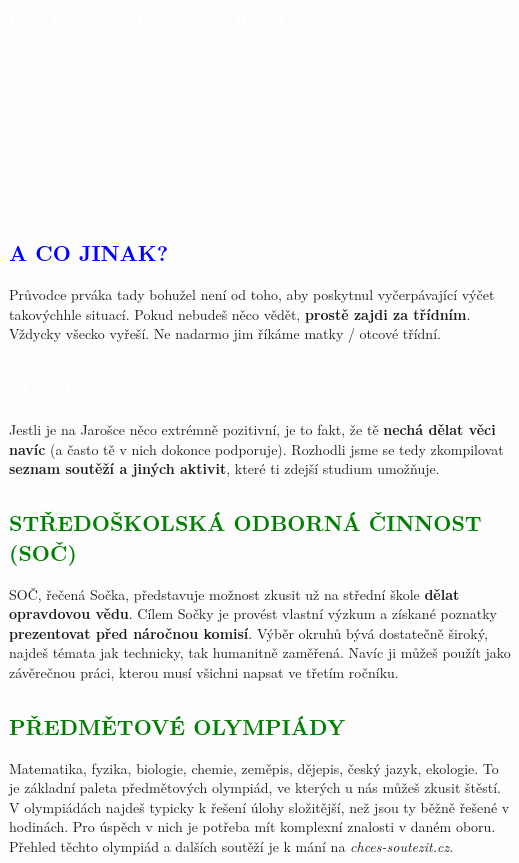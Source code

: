 \documentclass{article}
\newcommand{\nadpiss}[1]{
\vspace*{-60pt}
  \begin{nadpisboxs}
    \vspace*{20pt}
    \centering \section*{\textcolor{white}{#1}}
  \end{nadpisboxs}
}
\newcommand{\podnadpisf}[1]{
  \subsection*{\textcolor{blue}{#1}}
}
\newcommand{\podnadpiss}[1]{
  \subsection*{\textcolor{green}{#1}}
}
\begin{document}
\begin{bluebox}
  \textcolor{white}{\subsection*{OMLUVENÍ Z TĚLOCVIKU}
  To by jen tak nešlo. Nejdřív ti \textbf{doktor musí vydat nějaké lejstro} či potvrzení o tom, že do toho tělocviku prostě nemůžeš chodit, pak ho předáš nám a... jsi omluven. Bude tam ještě trocha papírování, ale snažíme se vycházet vstříc (nebudeme, proboha, nikoho nutit cvičit se sádrou). V prváku také podstupujeme \textbf{test plavecké zdatnosti}, kterému se nevyhneš bez uvolnění. Pokud na něj v prváku nepřijdeš, půjdeš ve druháku. Tak důslední jsme. (Pokud nepřijdeš v druháku, přijdeš ve třeťáku. Pokud nepřijdeš ve třeťáku a zvolíš si vodácký kurz, budeš zkoušky provádět na místě před všemi svými spolužáky.)
  }
\end{bluebox}

\podnadpisf{A CO JINAK?}
Průvodce prváka tady bohužel není od toho, aby poskytnul vyčerpávající výčet takovýchhle situací. Pokud nebudeš něco vědět, \textbf{prostě zajdi za třídním}. Vždycky všecko vyřeší. Ne nadarmo jim říkáme matky / otcové třídní.

\pagebreak

\nadpiss{SOUTĚŽE}
\noindent Jestli je na Jarošce něco extrémně pozitivní, je to fakt, že tě \textbf{nechá dělat věci navíc} (a často tě v nich dokonce podporuje). Rozhodli jsme se tedy zkompilovat \textbf{seznam soutěží a jiných aktivit}, které ti zdejší studium umožňuje.

\vspace{5pt}
\podnadpiss{STŘEDOŠKOLSKÁ ODBORNÁ ČINNOST (SOČ)}
SOČ, řečená Sočka, představuje možnost zkusit už na střední škole \textbf{dělat opravdovou vědu}. Cílem Sočky je provést vlastní výzkum a získané poznatky \textbf{prezentovat před náročnou komisí}. Výběr okruhů bývá dostatečně široký, najdeš témata jak technicky, tak humanitně zaměřená. Navíc ji můžeš použít jako závěrečnou práci, kterou musí všichni napsat ve třetím ročníku.

\podnadpiss{PŘEDMĚTOVÉ OLYMPIÁDY}
Matematika, fyzika, biologie, chemie, zeměpis, dějepis, český jazyk, ekologie. To je základní paleta předmětových olympiád, ve kterých u nás můžeš zkusit štěstí. V olympiádách najdeš typicky k řešení úlohy složitější, než jsou ty běžně řešené v hodinách. Pro úspěch v nich je potřeba mít komplexní znalosti v daném oboru. Přehled těchto olympiád a dalších soutěží je k mání na \textit{chces-soutezit.cz}.
\end{document}
